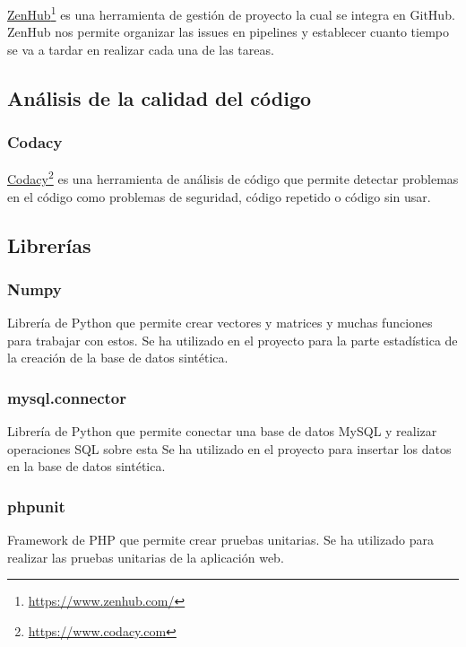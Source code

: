 \href{https://www.zenhub.com/}{ZenHub}\footnote{\href{https://www.zenhub.com/}{https://www.zenhub.com/}} es una herramienta de gestión de proyecto la cual se integra en GitHub. ZenHub nos permite organizar las issues en pipelines y establecer cuanto tiempo se va a tardar en realizar cada una de las tareas.

\subsection{Análisis de la calidad del código}

\subsubsection{Codacy} \label{Codacy}

\href{https://www.codacy.com}{Codacy}\footnote{\href{https://www.codacy.com}{https://www.codacy.com}} es una herramienta de análisis de código que permite detectar problemas en el código como problemas de seguridad, código repetido o código sin usar.

\subsection{Librerías}\label{librerias}

\subsubsection{Numpy}

Librería de Python que permite crear vectores y matrices y muchas funciones para trabajar con estos. Se ha utilizado en el proyecto para la parte estadística de la creación de la base de datos sintética.  

\subsubsection{mysql.connector}

Librería de Python que permite conectar una base de datos MySQL y realizar operaciones SQL sobre esta Se ha utilizado en el proyecto para insertar los datos en la base de datos sintética.

\subsubsection{phpunit}

Framework de PHP que permite crear pruebas unitarias. Se ha utilizado para realizar las pruebas unitarias de la aplicación web.

